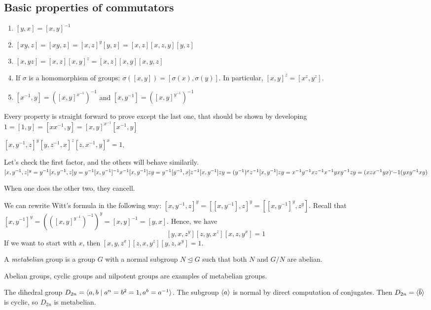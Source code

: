 \documentclass[twoside, 11pt]{article}
\begin{document}
\subsection{Basic properties of commutators}
\begin{enumerate}
\item $[y,x]=[x,y]^{-1}$
\item $[xy,z]=[xy,z]=[x,z]^y[y,z]=[x,z][x,z,y][y,z]$
\item $[x,yz]=[x,z][x,y]^z=[x,z][x,y][x,y,z]$
\item If $\sigma$ is a homomorphism of groups: $\sigma([x,y])=[\sigma(x),\sigma(y)]$. In particular, $[x,y]^z=[x^z,y^z]$. 
\item $[x^{-1},y]=([x,y]^{x^{-1}})^{-1}$ and $[x,y^{-1}]=([x,y]^{y^{-1}})^{-1}$
\end{enumerate}
Every property is straight forward to prove except the last one, that should be shown by developing $1=[1,y]=[xx^{-1}, y]=[x,y]^{x^{-1}}[x^{-1},y]$

\begin{teorema}
$[x,y^{-1},z]^y[y,z^{-1},x]^z[z,x^{-1},y]^x=1$. 
\end{teorema}
\begin{dem}
Let's check the first factor, and the others will behave similarily. $[x,y^{-1},z]^y=y^{-1}[x,y^{-1},z]y=y^{-1}[x,y^{-1}]^{-1}x^{-1}[x,y^{-1}]zy=y^{-1}[y^{-1},x]z^{-1}[x,y^{-1}]zy=(y^{-1})^x z^{-1}[x,y^{-1}]zy=x^{-1}y^{-1}xz^{-1}x^{-1}yxy^{-1}zy=(xzx^{-1}yx)`{-1}(yxy^{-1}xy)$

When one does the other two, they cancell.
\end{dem}

We can rewrite Witt's formula in the following way:
$[x,y^{-1},z]^y=[[x,y^{-1}],z]^y=[[x,y^{-1}]^y, z^y]$. Recall that $[x,y^{-1}]^y=(([x,y]^{y^{-1}})^{-1})^y=[x,y]^{-1}=[y,x]$. Hence, we have
\[
[y,x,z^y][z,y,x^z][x,z,y^{x}]=1
\]
If we want to start with $x$, then $[x,y,z^x][z,x,y^z][y,z,x^y]=1$.

\begin{defi}
A \emph{metabelian} group is a group $G$ with a normal subgroup $N\trianglelefteq G$ such that both $N$ and $G/N$ are abelian. 
\end{defi}
Abelian groups, cyclic groups and nilpotent groups are examples of metabelian groups. 

\begin{ej}
The dihedral group $D_{2n}=\langle{a,b\mid a^n=b^2=1, a^b=a^{-1}}\rangle$. The subgroup $\langle{a}\rangle$ is normal by direct computation of conjugates. Then $D_{2n}=\langle{\overline{b}}\rangle$ is cyclic, so $D_{2n}$ is metabelian.
\end{ej}
\end{document}

